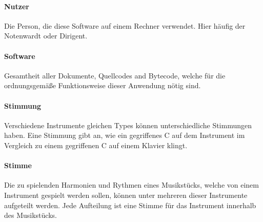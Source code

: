 \documentclass[10pt]{scrartcl}
\begin{document}
\paragraph*{Nutzer} Die Person, die diese Software auf einem Rechner verwendet. Hier häufig der Notenwardt oder Dirigent.
\paragraph*{Software} Gesamtheit aller Dokumente, Quellcodes and Bytecode, welche für die ordnungsgemäße Funktionsweise dieser Anwendung nötig sind.
\paragraph*{Stimmung} Verschiedene Instrumente gleichen Types können unterschiedliche Stimmungen haben. Eine Stimmung gibt an, wie ein gegriffenes C auf dem Instrument im Vergleich zu einem gegriffenen C auf einem Klavier klingt.
\paragraph*{Stimme} Die zu spielenden Harmonien und Rythmen eines Musikstücks, welche von einem Instrument gespielt werden sollen, können unter mehreren dieser Instrumente aufgeteilt werden. Jede Aufteilung ist eine Stimme für das Instrument innerhalb des Musikstücks. 
\end{document}
